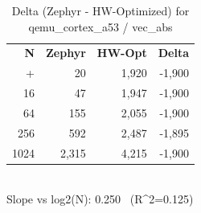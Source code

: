 \begin{table}[tb]
    \centering
    \caption{Delta (Zephyr - HW-Optimized) for qemu_cortex_a53 / vec_abs}
    \label{tab:delta_qemu_cortex_a53_vec_abs}
    \scriptsize
    \begin{tabular}{r r r r}
        \hline
        \textbf{N} & \textbf{Zephyr} & \textbf{HW-Opt} & \textbf{Delta} \\\n+        \hline
        4 & 20 & 1,920 & -1,900\\
        16 & 47 & 1,947 & -1,900\\
        64 & 155 & 2,055 & -1,900\\
        256 & 592 & 2,487 & -1,895\\
        1024 & 2,315 & 4,215 & -1,900\\
        \hline
    \end{tabular}
    \vspace{2mm}\\\n    Slope vs log2(N): 0.250 \ (R^2=0.125)\n\end{table}
